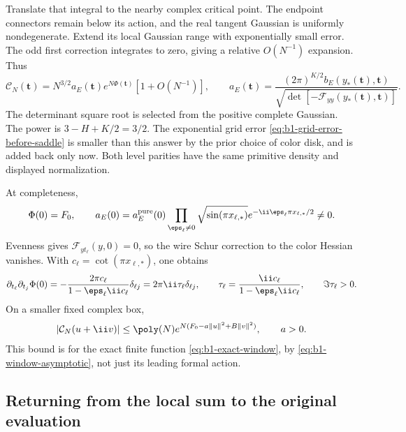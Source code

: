 Translate that integral to the nearby complex critical point. The
endpoint connectors remain below its action, and the real tangent
Gaussian is uniformly nondegenerate. Extend its local Gaussian range
with exponentially small error. The odd first correction integrates to
zero, giving a relative $O(N^{-1})$ expansion. Thus
\begin{equation}\label{eq:b1-window-asymptotic}
 \mathcal C_N(\mathbf t)
 =N^{3/2}a_E(\mathbf t)e^{N\Phi(\mathbf t)}[1+O(N^{-1})],
 \qquad
 a_E(\mathbf t)=\frac{(2\pi)^{K/2}b_E(y_*(\mathbf t),\mathbf t)}
                    {\sqrt{\det[-\mathcal F_{yy}(y_*(\mathbf t),\mathbf t)]}}.
\end{equation}
The determinant square root is selected from the positive complete
Gaussian. The power is
$3-H+K/2=3/2$. The exponential grid error
\eqref{eq:b1-grid-error-before-saddle} is smaller than this answer by
the prior choice of color disk, and is added back only now. Both level
parities have the same primitive density and displayed normalization.

At completeness,
\begin{equation}\label{eq:b1-global-amplitude}
 \Phi(0)=F_0,\qquad
 a_E(0)=a_E^{\rm pure}(0)
 \prod_{\eps_\ell\ne0}
   \sqrt{\sin(\pi x_{\ell,*})}e^{-\ii\eps_\ell\pi x_{\ell,*}/2}\ne0.
\end{equation}
Evenness gives $\mathcal F_{yt_\ell}(y,0)=0$, so the wire Schur
correction to the color Hessian vanishes. With
$c_\ell=\cot(\pi x_{\ell,*})$, one obtains
\begin{equation}\label{eq:b1-global-hessian}
 \partial_{t_\ell}\partial_{t_j}\Phi(0)
 =-\frac{2\pi c_\ell}{1-\eps_\ell\ii c_\ell}\delta_{\ell j}
 =2\pi\ii\tau_\ell\delta_{\ell j},
 \qquad \tau_\ell=\frac{\ii c_\ell}{1-\eps_\ell\ii c_\ell},
 \qquad \Im\tau_\ell>0.
\end{equation}
On a smaller fixed complex box,
\begin{equation}\label{eq:b1-finite-packet-envelope}
 |\mathcal C_N(u+\ii v)|
 \le\poly(N)e^{N(F_0-a\|u\|^2+B\|v\|^2)},\qquad a>0.
\end{equation}
This bound is for the exact finite function
\eqref{eq:b1-exact-window}, by
\eqref{eq:b1-window-asymptotic}, not just its leading formal action.

\subsection{Returning from the local sum to the original evaluation}

